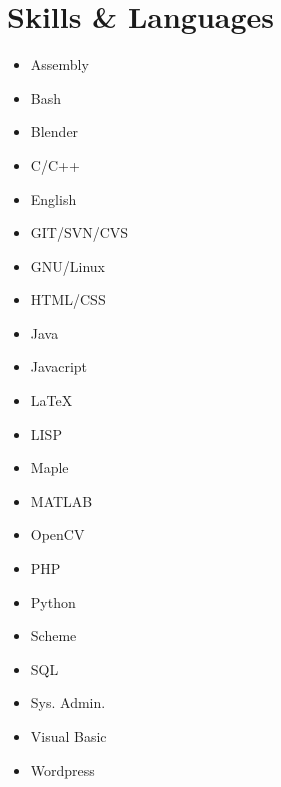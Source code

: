 \documentclass[a4paper,10pt]{article}
\begin{document}
\section{Skills \& Languages}
\begin{multicols}{3}
\raggedcolumns
\begin{itemize}
\renewcommand{\labelitemi}{\textcolor{lightg}{\symbol{"00BB}}}
\setlength{\itemsep}{1pt}
\setlength{\parskip}{0pt}
\setlength{\parsep}{0pt}
\item Assembly \hfill \twonotes
\item Bash \hfill \fournotes
\item Blender \hfill \threenotes
\item C/C++ \hfill \fournotes 
\item English \hfill \fivenotes
\item GIT/SVN/CVS \hfill \fournotes
\item GNU/Linux \hfill \fournotes
\item HTML/CSS \hfill \fournotes
\item Java \hfill \fivenotes
\item Javacript \hfill \threenotes
\item \LaTeX \hfill \threenotes
\item LISP \hfill \onenote
\item Maple \hfill \threenotes
\item MATLAB \hfill \fivenotes
\item OpenCV \hfill \fournotes
\item PHP \hfill \fournotes
\item Python \hfill \threenotes
\item Scheme \hfill \fivenotes
\item SQL \hfill \threenotes
\item Sys. Admin. \hfill \threenotes
\item Visual Basic \hfill \fivenotes
\item Wordpress \hfill \fournotes
\end{itemize}
\end{multicols}
\end{document}
